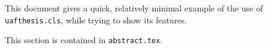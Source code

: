 This document gives a quick, relatively minimal example of the use of
\texttt{uafthesis.cls}, while trying to show its features.

This section is contained in \texttt{abstract.tex}.
